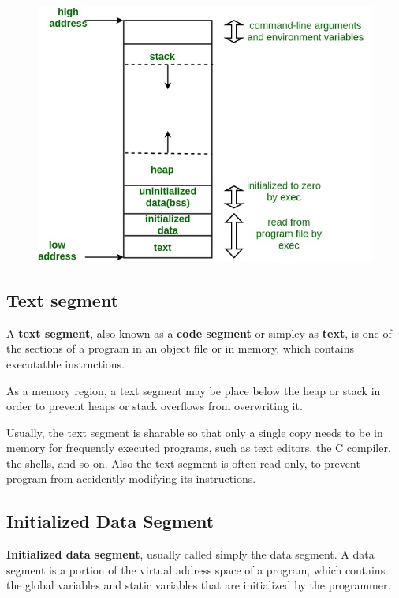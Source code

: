 \documentclass[a5paper,pagesize,10pt,bibtotoc,pointlessnumbers, normalheadings,DIV=9,twoside=false]{scrbook}
\begin{document}
\begin{figure}[!htb]
	\centering
	\includegraphics[width=\textwidth]{pictures/memoryLayoutC.jpg}
\end{figure}

\subsection{Text segment}
A \textbf{text segment}, also known as a \textbf{code segment} or simpley as \textbf{text},
is one of the sections of a program in an object file or in memory,
which contains executatble instructions.

As a memory region, a text segment may be place below the heap or stack 
in order to prevent heaps or stack overflows from overwriting it.

Usually, the text segment is sharable so that only a single copy needs to be 
in memory for frequently executed programs, such as text editors, the C compiler, 
the shells, and so on. Also the text segment is often read-only, to prevent program
from accidently modifying its instructions.


\subsection{Initialized Data Segment}
\textbf{Initialized data segment}, usually called simply the data segment. 
A data segment is a portion of the virtual address space of a program, 
which contains the global variables and static variables that are initialized by the programmer.
\end{document}
